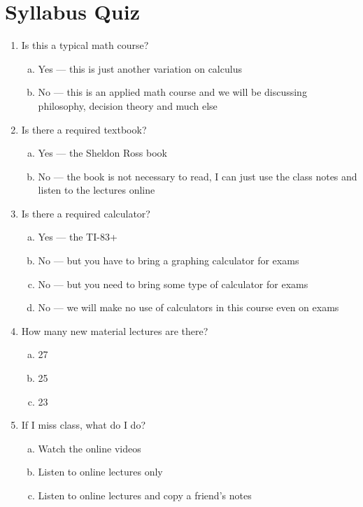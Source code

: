 \section*{Syllabus Quiz}\label{quiz}

\begin{enumerate}[1.]
\item Is this a typical math course?

\begin{enumerate}[(a)]
\item Yes --- this is just another variation on calculus
\item No --- this is an applied math course and we will be discussing philosophy, decision theory and much else
\end{enumerate}

\item Is there a required textbook?

\begin{enumerate}[(a)]
\item Yes --- the Sheldon Ross book
\item No --- the book is not necessary to read, I can just use the class notes and listen to the lectures online
\end{enumerate}

\item Is there a required calculator?

\begin{enumerate}[(a)]
\item Yes --- the TI-83+
\item No --- but you have to bring a graphing calculator for exams
\item No --- but you need to bring some type of calculator for exams
\item No --- we will make no use of calculators in this course even on exams
\end{enumerate}

\item How many new material lectures are there?

\begin{enumerate}[(a)]
\item 27
\item 25
\item 23
\end{enumerate}


\item If I miss class, what do I do?

\begin{enumerate}[(a)]
\item Watch the online videos
\item Listen to online lectures only
\item Listen to online lectures and copy a friend's notes
\end{enumerate}


\end{enumerate}
